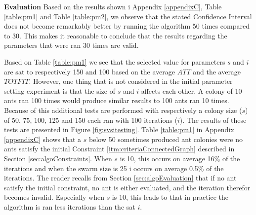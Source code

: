 \textbf{Evaluation}
\newline
Based on the results shown i Appendix \ref{appendixC}, Table \vref{table:pm1} and Table \vref{table:pm2}, we observe that the stated Confidence Interval does not become remarkably better by running the algorithm 50 times compared to 30. This makes it reasonable to conclude that the results regarding the parameters that were ran 30 times are valid. 
\newline

Based on Table \vref{table:pm1} we see that the selected value for parameters $s$ and $i$ are sat to respectively 150 and 100 based on the average $ATT$ and the average $TOTFIT$. However, one thing that is not considered in the initial parameter setting experiment is that the size of $s$ and $i$ affects each other. A colony of 10 ants ran 100 times would produce similar results to 100 ants ran 10 times. Because of this additional tests are performed with respectively a colony size ($s$) of 50, 75, 100, 125 and 150 each ran with 100 iterations ($i$). The results of these tests are presented in Figure \vref{fig:svsitesting}. Table \vref{table:pm1} in Appendix \ref{appendixC} shows that a $s$ below 50 sometimes produced ant colonies were no ants satisfy the initial Constraint \ref{itm:criteriaConnectedGraph} described in Section \vref{sec:algoConstraints}. When $s$ is 10, this occurs on average 16\% of the iterations and when the swarm size is 25 i occurs on average 0.5\% of the iterations. The reader recalls from Section \vref{sec:algoEvaluation} that if no ant satisfy the initial constraint, no ant is either evaluated, and the iteration therefor becomes invalid. Especially when $s$ is 10, this leads to that in practice the algorithm is ran less iterations than the sat $i$. 

